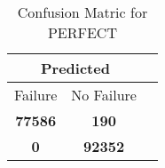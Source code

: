\begin{table}[] 
\caption{Confusion Matric for PERFECT} 
\label{Table: Prediction Accuracy-DMDPERFECTOnlySunEKF-ignoreReflectionEKF-top2perfectNoFailurePrediction-Reflection} 
\centering 
\begin{tabular} 
 {@{}ccc@{}} 
\toprule 
\multicolumn{2}{c}{\textbf{Predicted}}
 \\ \midrule 
\multicolumn{1}{|c|}{Failure} & 
\multicolumn{1}{c|}{No Failure}
 \\ \midrule 
\multicolumn{1}{|c|}{\color{green}\textbf{77586}} & 
\multicolumn{1}{c|}{\color{red}\textbf{190}}
 \\ \midrule 
\multicolumn{1}{|c|}{\color{red}\textbf{0}} & 
\multicolumn{1}{c|}{\color{green}\textbf{92352}}
 \\ \bottomrule 
\end{tabular} 
\end{table} 
